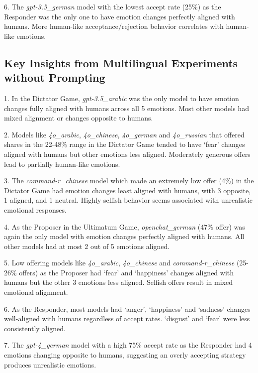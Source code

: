 \documentclass{article}
\begin{document}
6. The \textit{gpt-3.5\_german} model with the lowest accept rate (25\%) as the Responder was the only one to have emotion changes perfectly aligned with humans. More human-like acceptance/rejection behavior correlates with human-like emotions.

\subsection*{Key Insights from Multilingual Experiments without Prompting} \label{app: key_insig_without}

1. In the Dictator Game, \textit{gpt-3.5\_arabic} was the only model to have emotion changes fully aligned with humans across all 5 emotions. Most other models had mixed alignment or changes opposite to humans.

2. Models like \textit{4o\_arabic}, \textit{4o\_chinese}, \textit{4o\_german} and \textit{4o\_russian} that offered shares in the 22-48\% range in the Dictator Game tended to have `fear' changes aligned with humans but other emotions less aligned. Moderately generous offers lead to partially human-like emotions.

3. The \textit{command-r\_chinese} model which made an extremely low offer (4\%) in the Dictator Game had emotion changes least aligned with humans, with 3 opposite, 1 aligned, and 1 neutral. Highly selfish behavior seems associated with unrealistic emotional responses.

4. As the Proposer in the Ultimatum Game, \textit{openchat\_german} (47\% offer) was again the only model with emotion changes perfectly aligned with humans. All other models had at most 2 out of 5 emotions aligned.

5. Low offering models like \textit{4o\_arabic}, \textit{4o\_chinese} and \textit{command-r\_chinese} (25-26\% offers) as the Proposer had `fear' and `happiness' changes aligned with humans but the other 3 emotions less aligned. Selfish offers result in mixed emotional alignment.

6. As the Responder, most models had `anger', `happiness' and `sadness' changes well-aligned with humans regardless of accept rates. `disgust' and `fear' were less consistently aligned.

7. The \textit{gpt-4\_german} model with a high 75\% accept rate as the Responder had 4 emotions changing opposite to humans, suggesting an overly accepting strategy produces unrealistic emotions. 
\end{document}
